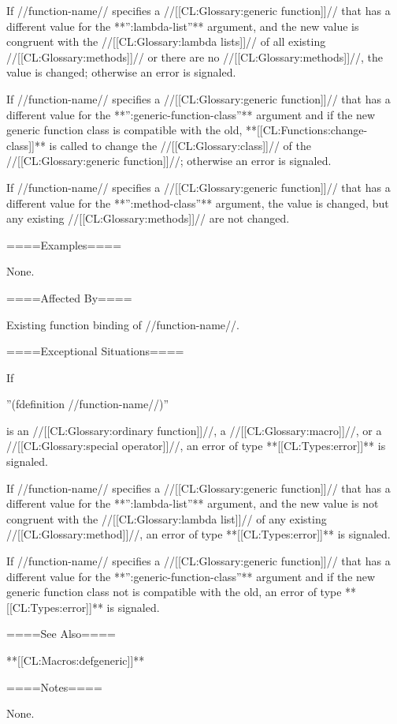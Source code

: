 If //function-name// specifies a //[[CL:Glossary:generic function]]// that has a different value for the **'':lambda-list''** argument, and the new value is congruent with the //[[CL:Glossary:lambda lists]]// of all existing //[[CL:Glossary:methods]]// or there are no //[[CL:Glossary:methods]]//, the value is changed; otherwise an error is signaled.


If //function-name// specifies a //[[CL:Glossary:generic function]]// that has a different value for the **'':generic-function-class''** argument and if the new generic function class is compatible with the old, **[[CL:Functions:change-class]]** is called to change the //[[CL:Glossary:class]]// of the //[[CL:Glossary:generic function]]//; otherwise an error is signaled.

If //function-name// specifies a //[[CL:Glossary:generic function]]// that has a different value for the **'':method-class''** argument, the value is changed, but any existing //[[CL:Glossary:methods]]// are not changed.

====Examples====

None.

====Affected By====

Existing function binding of //function-name//.

====Exceptional Situations====

If

''(fdefinition //function-name//)''

is an //[[CL:Glossary:ordinary function]]//, a //[[CL:Glossary:macro]]//, or a //[[CL:Glossary:special operator]]//, an error of type **[[CL:Types:error]]** is signaled.

If //function-name// specifies a //[[CL:Glossary:generic function]]// that has a different value for the **'':lambda-list''** argument, and the new value is not congruent with the //[[CL:Glossary:lambda list]]// of any existing //[[CL:Glossary:method]]//, an error of type **[[CL:Types:error]]** is signaled.

If //function-name// specifies a //[[CL:Glossary:generic function]]// that has a different value for the **'':generic-function-class''** argument and if the new generic function class not is compatible with the old, an error of type **[[CL:Types:error]]** is signaled.


====See Also====

**[[CL:Macros:defgeneric]]**

====Notes====

None.


 
